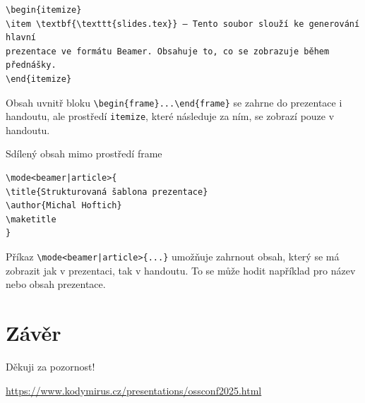 \begin{verbatim}
\begin{itemize}
\item \textbf{\texttt{slides.tex}} – Tento soubor slouží ke generování hlavní
prezentace ve formátu Beamer. Obsahuje to, co se zobrazuje během přednášky.
\end{itemize}
\end{verbatim}

Obsah uvnitř bloku \verb|\begin|\verb|{frame}...\end|\verb|{frame}| se zahrne
do prezentace i handoutu, ale prostředí \texttt{itemize}, které následuje za
ním, se zobrazí pouze v handoutu.

\begin{frame}[fragile]{Sdílený obsah mimo prostředí frame}

\begin{verbatim}
\mode<beamer|article>{
\title{Strukturovaná šablona prezentace}
\author{Michal Hoftich}
\maketitle
}
\end{verbatim}
\end{frame}

Příkaz \verb|\|\verb+mode<beamer|article>{...}+ umožňuje zahrnout obsah, který se má
zobrazit jak v prezentaci, tak v handoutu. To se může hodit například pro název
nebo obsah prezentace.

\section{Závěr}

\begin{frame}[standout]{}
  \begin{block}{}
    Děkuji za pozornost!
  \end{block}
  \begin{block}{}
    \small
  \url{https://www.kodymirus.cz/presentations/ossconf2025.html}
  \end{block}

\end{frame}





